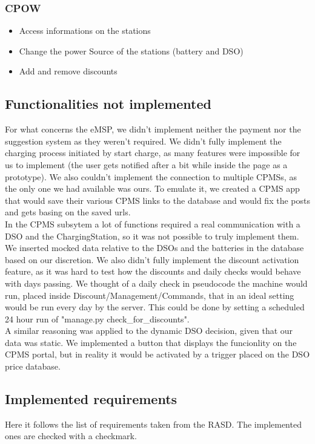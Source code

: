 \documentclass[table, 12pt]{article}
\begin{document}
\subsubsection*{CPOW}
\begin{itemize}
    \item Access informations on the stations
    \item Change the power Source of the stations (battery and DSO)
    \item Add and remove discounts
\end{itemize}

\subsection{Functionalities not implemented}
For what concerns the eMSP, we didn't implement neither the payment nor the suggestion system as they weren't required. We didn't fully implement the charging process initiated by start charge, as many 
features were impossible for us to implement (the user gets notified after a bit while inside the page as a prototype). We also couldn't implement the connection to multiple CPMSs, as the only one we had available was ours.
To emulate it, we created a CPMS app that would save their various CPMS links to the database and would fix the posts and gets basing on the saved urls. \\
In the CPMS subsytem a lot of functions required a real communication with a DSO and the ChargingStation, so it was not possible to truly implement them. We inserted mocked data relative to the DSOs and the batteries in the database based on our discretion.
We also didn't fully implement the discount activation feature, as it was hard to test how the discounts and daily checks would behave with days passing. We thought of a 
daily check in pseudocode the machine would run, placed inside Discount/Management/Commands, that in an ideal setting would be run every day by the server. This could be done by setting a scheduled 24 hour run of "manage.py check\_for\_discounts".\\
A similar reasoning was applied to the dynamic DSO decision, given that our data was static. We implemented a button that displays the funcionlity on the CPMS portal, but in reality it would be activated by a trigger
placed on the DSO price database.
\subsection{Implemented requirements}
Here it follows the list of requirements taken from the RASD.
The implemented ones are checked with a checkmark.
\end{document}
